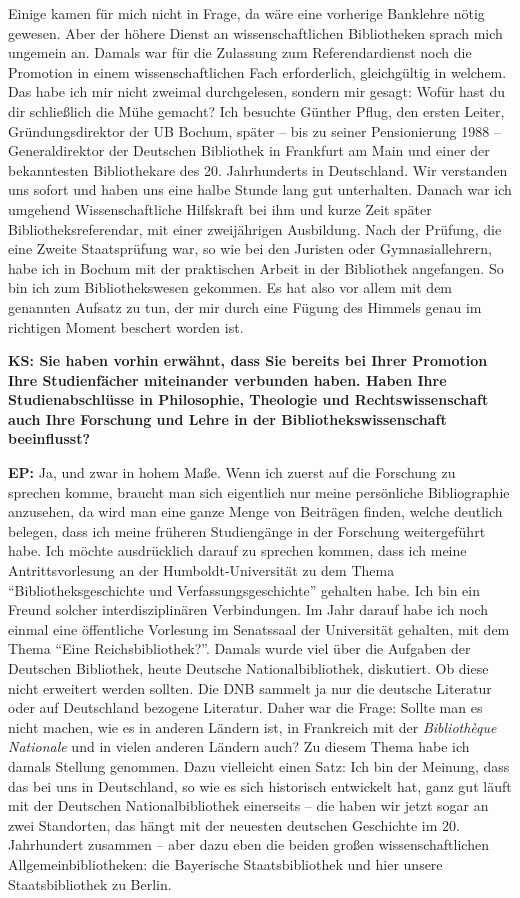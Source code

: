 \documentclass[a4paper,
fontsize=11pt,
oneside,
numbers=noperiodatend,
parskip=half-,
bibliography=totoc,
final
]{scrartcl}
\begin{document}
Einige kamen für mich nicht in Frage, da wäre eine vorherige Banklehre
nötig gewesen. Aber der höhere Dienst an wissenschaftlichen Bibliotheken
sprach mich ungemein an. Damals war für die Zulassung zum
Referendardienst noch die Promotion in einem wissenschaftlichen Fach
erforderlich, gleichgültig in welchem. Das habe ich mir nicht zweimal
durchgelesen, sondern mir gesagt: Wofür hast du dir schließlich die Mühe
gemacht? Ich besuchte Günther Pflug, den ersten Leiter,
Gründungsdirektor der UB Bochum, später -- bis zu seiner Pensionierung
1988 -- Generaldirektor der Deutschen Bibliothek in Frankfurt am Main
und einer der bekanntesten Bibliothekare des 20. Jahrhunderts in
Deutschland. Wir verstanden uns sofort und haben uns eine halbe Stunde
lang gut unterhalten. Danach war ich umgehend Wissenschaftliche
Hilfskraft bei ihm und kurze Zeit später Bibliotheksreferendar, mit
einer zweijährigen Ausbildung. Nach der Prüfung, die eine Zweite
Staatsprüfung war, so wie bei den Juristen oder Gymnasiallehrern, habe
ich in Bochum mit der praktischen Arbeit in der Bibliothek angefangen.
So bin ich zum Bibliothekswesen gekommen. Es hat also vor allem mit dem
genannten Aufsatz zu tun, der mir durch eine Fügung des Himmels genau im
richtigen Moment beschert worden ist.

\textbf{KS: Sie haben vorhin erwähnt, dass Sie bereits bei Ihrer
Promotion Ihre Studienfächer miteinander verbunden haben. Haben Ihre
Studienabschlüsse in Philosophie, Theologie und Rechtswissenschaft auch
Ihre Forschung und Lehre in der Bibliothekswissenschaft beeinflusst?}

\textbf{EP:} Ja, und zwar in hohem Maße. Wenn ich zuerst auf die
Forschung zu sprechen komme, braucht man sich eigentlich nur meine
persönliche Bibliographie anzusehen, da wird man eine ganze Menge von
Beiträgen finden, welche deutlich belegen, dass ich meine früheren
Studiengänge in der Forschung weitergeführt habe. Ich möchte
ausdrücklich darauf zu sprechen kommen, dass ich meine Antrittsvorlesung
an der Humboldt-Universität zu dem Thema \enquote{Bibliotheksgeschichte
und Verfassungsgeschichte} gehalten habe. Ich bin ein Freund solcher
interdisziplinären Verbindungen. Im Jahr darauf habe ich noch einmal
eine öffentliche Vorlesung im Senatssaal der Universität gehalten, mit
dem Thema \enquote{Eine Reichsbibliothek?}. Damals wurde viel über die
Aufgaben der Deutschen Bibliothek, heute Deutsche Nationalbibliothek,
diskutiert. Ob diese nicht erweitert werden sollten. Die DNB sammelt ja
nur die deutsche Literatur oder auf Deutschland bezogene Literatur.
Daher war die Frage: Sollte man es nicht machen, wie es in anderen
Ländern ist, in Frankreich mit der \emph{Bibliothèque Nationale} und in
vielen anderen Ländern auch? Zu diesem Thema habe ich damals Stellung
genommen. Dazu vielleicht einen Satz: Ich bin der Meinung, dass das bei
uns in Deutschland, so wie es sich historisch entwickelt hat, ganz gut
läuft mit der Deutschen Nationalbibliothek einerseits -- die haben wir
jetzt sogar an zwei Standorten, das hängt mit der neuesten deutschen
Geschichte im 20. Jahrhundert zusammen -- aber dazu eben die beiden
großen wissenschaftlichen Allgemeinbibliotheken: die Bayerische
Staatsbibliothek und hier unsere Staatsbibliothek zu Berlin.
\end{document}
